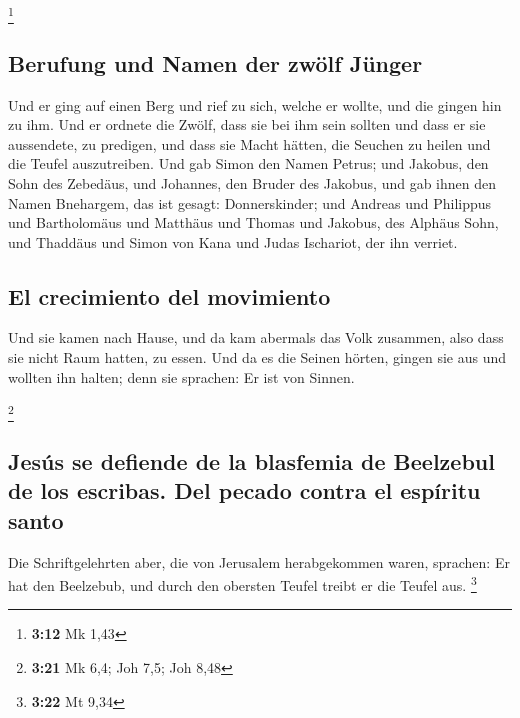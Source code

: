 \footnote{\textbf{3:12} Mk 1,43}

\hypertarget{berufung-und-namen-der-zwuxf6lf-juxfcnger}{%
\subsection{Berufung und Namen der zwölf
Jünger}\label{berufung-und-namen-der-zwuxf6lf-juxfcnger}}

 Und er ging auf einen Berg und rief zu sich, welche er
wollte, und die gingen hin zu ihm.  Und er ordnete die
Zwölf, dass sie bei ihm sein sollten und dass er sie aussendete, zu
predigen,  und dass sie Macht hätten, die Seuchen zu
heilen und die Teufel auszutreiben.  Und gab Simon den
Namen Petrus;  und Jakobus, den Sohn des Zebedäus, und
Johannes, den Bruder des Jakobus, und gab ihnen den Namen Bnehargem, das
ist gesagt: Donnerskinder;  und Andreas und Philippus und
Bartholomäus und Matthäus und Thomas und Jakobus, des Alphäus Sohn, und
Thaddäus und Simon von Kana  und Judas Ischariot, der ihn
verriet.

\hypertarget{el-crecimiento-del-movimiento}{%
\subsection{El crecimiento del
movimiento}\label{el-crecimiento-del-movimiento}}

 Und sie kamen nach Hause, und da kam abermals das Volk
zusammen, also dass sie nicht Raum hatten, zu essen.  Und
da es die Seinen hörten, gingen sie aus und wollten ihn halten; denn sie
sprachen: Er ist von Sinnen.

\footnote{\textbf{3:21} Mk 6,4; Joh 7,5; Joh 8,48}

\hypertarget{jesuxfas-se-defiende-de-la-blasfemia-de-beelzebul-de-los-escribas.-del-pecado-contra-el-espuxedritu-santo}{%
\subsection{Jesús se defiende de la blasfemia de Beelzebul de los
escribas. Del pecado contra el espíritu
santo}\label{jesuxfas-se-defiende-de-la-blasfemia-de-beelzebul-de-los-escribas.-del-pecado-contra-el-espuxedritu-santo}}

 Die Schriftgelehrten aber, die von Jerusalem
herabgekommen waren, sprachen: Er hat den Beelzebub, und durch den
obersten Teufel treibt er die Teufel aus. \footnote{\textbf{3:22} Mt
  9,34}

